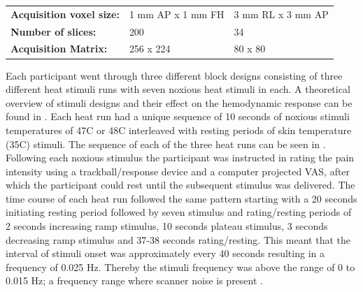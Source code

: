 \begin{table}[H]
\begin{tabular}{lll}
	\textbf{Acquisition voxel size:} & 1 mm AP x 1 mm FH                                                             & 3 mm RL x 3 mm AP                                                             \\
	\textbf{Number of slices:}       & 200                                                                           & 34                                                                            \\
	\textbf{Acquisition Matrix:}     & 256 x 224                                                                     & 80 x 80                                                                       \\ \hline
\end{tabular}
\end{table}
 
Each participant went through three different block designs consisting of three different heat stimuli runs with seven noxious heat stimuli in each. A theoretical overview of stimuli designs and their effect on the hemodynamic response can be found in . Each heat run had a unique sequence of 10 seconds of noxious stimuli temperatures of 47\degree C or 48\degree C interleaved with resting periods of skin temperature (35\degree C) stimuli. The sequence of each of the three heat runs can be seen in . 
Following each noxious stimulus the participant was instructed in rating the pain intensity using a trackball/response device and a computer projected VAS, after which the participant could rest until the subsequent stimulus was delivered. The time course of each heat run followed the same pattern starting with a 20 seconds initiating resting period followed by seven stimulus and rating/resting periods of 2 seconds increasing ramp stimulus, 10 seconds plateau stimulus, 3 seconds decreasing ramp stimulus and 37-38 seconds rating/resting. This meant that the interval of stimuli onset was approximately every 40 seconds resulting in a frequency of 0.025 Hz. Thereby the stimuli frequency was above the range of 0 to 0.015 Hz; a frequency range where scanner noise is present \cite{Poldrack2011}.


